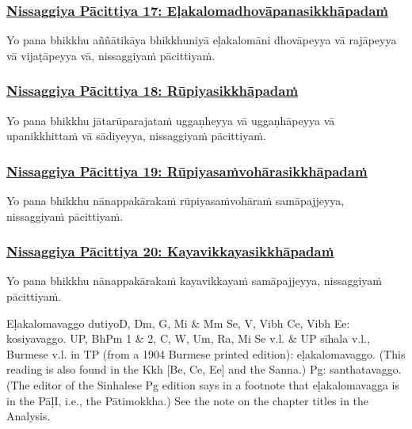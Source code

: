 \subsubsection*{\hyperref[forf-exp17]{Nissaggiya Pācittiya 17: Eḷakalomadhovāpanasikkhāpadaṁ}}
\label{np17}

Yo pana bhikkhu aññātikāya bhikkhuniyā eḷakalomāni dhovāpeyya vā rajāpeyya vā vijaṭāpeyya vā, nissaggiyaṁ pācittiyaṁ.



\subsubsection*{\hyperref[forf-exp18]{Nissaggiya Pācittiya 18: Rūpiyasikkhāpadaṁ}}
\label{np18}

Yo pana bhikkhu jātarūparajataṁ uggaṇheyya vā uggaṇhāpeyya vā upanikkhittaṁ vā sādiyeyya, nissaggiyaṁ pācittiyaṁ.



\subsubsection*{\hyperref[forf-exp19]{Nissaggiya Pācittiya 19: Rūpiyasaṁvohārasikkhāpadaṁ}}
\label{np19}

Yo pana bhikkhu nānappakārakaṁ rūpiyasaṁvohāraṁ samāpajjeyya, nissaggiyaṁ pācittiyaṁ.



\subsubsection*{\hyperref[forf-exp20]{Nissaggiya Pācittiya 20: Kayavikkayasikkhāpadaṁ}}
\label{np20}

Yo pana bhikkhu nānappakārakaṁ kayavikkayaṁ samāpajjeyya, nissaggiyaṁ pācittiyaṁ.

\begin{center}
	Eḷakalomavaggo dutiyo\makeatletter\hyperlink{endnote-appendix}\makeatother D, Dm, G, Mi & Mm Se, V, Vibh Ce, Vibh Ee: kosiyavaggo.
UP, BhPm 1 & 2, C, W, Um, Ra, Mi Se v.l. & UP sīhala v.l., Burmese v.l. in TP (from a 1904 Burmese printed edition):
eḷakalomavaggo. (This reading is also found in the Kkh [Be, Ce, Ee] and the  Sanna.) Pg:  santhatavaggo. (The editor of the
Sinhalese Pg edition says in a footnote that eḷakalomavagga is in the PāḷI, i.e., the Pātimokkha.) See the note on the chapter
titles in the Analysis.
\end{center}



